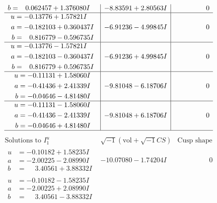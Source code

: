 \documentclass[1p]{elsarticle_modified}
\theoremstyle{definition}
\newcommand{\I}{\sqrt{-1}}
\begin{document}
$$\begin{array}{c|c|c}
\begin{aligned}
b &= \phantom{-}0.062457 + 1.376080 I\end{aligned}
 & -8.83591 + 2.80563 I & \phantom{-0.000000 } 0 \\ \hline\begin{aligned}
u &= -0.13776 + 1.57821 I \\
a &= -0.182103 + 0.360437 I \\
b &= \phantom{-}0.816779 - 0.596735 I\end{aligned}
 & -6.91236 - 4.99845 I & \phantom{-0.000000 } 0 \\ \hline\begin{aligned}
u &= -0.13776 - 1.57821 I \\
a &= -0.182103 - 0.360437 I \\
b &= \phantom{-}0.816779 + 0.596735 I\end{aligned}
 & -6.91236 + 4.99845 I & \phantom{-0.000000 } 0 \\ \hline\begin{aligned}
u &= -0.11131 + 1.58060 I \\
a &= -0.41436 + 2.41339 I \\
b &= -0.04646 - 4.81480 I\end{aligned}
 & -9.81048 - 6.18706 I & \phantom{-0.000000 } 0 \\ \hline\begin{aligned}
u &= -0.11131 - 1.58060 I \\
a &= -0.41436 - 2.41339 I \\
b &= -0.04646 + 4.81480 I\end{aligned}
 & -9.81048 + 6.18706 I & \phantom{-0.000000 } 0\\
 \hline 
 \end{array}$$\newpage$$\begin{array}{c|c|c}  
\text{Solutions to }I^u_{1}& \I (\text{vol} + \sqrt{-1}CS) & \text{Cusp shape}\\
 \hline 
\begin{aligned}
u &= -0.10182 + 1.58235 I \\
a &= -2.00225 - 2.08990 I \\
b &= \phantom{-}3.40561 + 3.88332 I\end{aligned}
 & -10.07080 - 1.74204 I & \phantom{-0.000000 } 0 \\ \hline\begin{aligned}
u &= -0.10182 - 1.58235 I \\
a &= -2.00225 + 2.08990 I \\
b &= \phantom{-}3.40561 - 3.88332 I\end{aligned}

\end{array}$$
\end{document}
